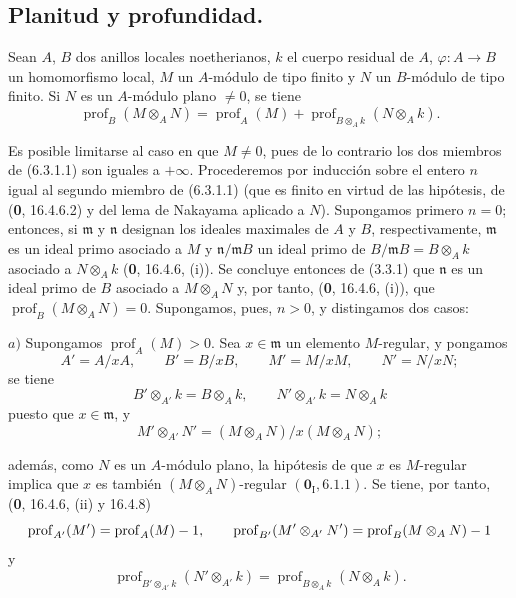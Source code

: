 \subsection{Planitud y profundidad.}

\begin{proposition}[6.3.1]
Sean $A$, $B$ dos anillos locales noetherianos, $k$ el cuerpo residual de
$A$, $\varphi:A\to B$ un homomorfismo local, $M$ un $A$-módulo de tipo finito
y $N$ un $B$-módulo de tipo finito. Si $N$ es un $A$-módulo plano $\neq0$, se
tiene
\begin{equation}
\operatorname{prof}_B(M\otimes_AN)=\operatorname{prof}_A(M)
+\operatorname{prof}_{B\otimes_Ak}(N\otimes_Ak).
\tag{6.3.1.1}\label{IV.2.s6.3.1.1-fr}
\end{equation}
\end{proposition}

Es posible limitarse al caso en que $M\neq0$, pues de lo contrario los dos
miembros de (6.3.1.1) son iguales a $+\infty$. Procederemos por inducción sobre
el entero $n$ igual al segundo miembro de (6.3.1.1) (que es finito en virtud
de las hipótesis, de (\textbf 0, 16.4.6.2) y del lema de Nakayama aplicado a $N$).
Supongamos primero $n=0$; entonces, si $\mathfrak m$ y $\mathfrak n$ designan
los ideales maximales de $A$ y $B$, respectivamente, $\mathfrak m$ es un ideal
primo asociado a $M$ y $\mathfrak n/\mathfrak mB$ un ideal primo de
$B/\mathfrak mB=B\otimes_Ak$ asociado a $N\otimes_Ak$ (\textbf 0, 16.4.6, (i)). Se
concluye entonces de (3.3.1) que $\mathfrak n$ es un ideal primo de $B$
asociado a $M\otimes_AN$ y, por tanto, (\textbf 0, 16.4.6, (i)), que
$\operatorname{prof}_B(M\otimes_AN)=0$. Supongamos, pues, $n>0$, y distingamos
dos casos:

$a)$ Supongamos $\operatorname{prof}_A(M)>0$. Sea $x\in\mathfrak m$ un
elemento $M$-regular, y pongamos
\[
A'=A/xA,\qquad B'=B/xB,\qquad M'=M/xM,\qquad N'=N/xN;
\]
se tiene
\[
B'\otimes_{A'}k=B\otimes_Ak,\qquad N'\otimes_{A'}k=N\otimes_Ak
\]
puesto que $x\in\mathfrak m$, y
\[
M'\otimes_{A'}N'=(M\otimes_AN)/x(M\otimes_AN);
\]


además, como $N$ es un $A$-módulo plano, la hipótesis de que $x$ es
$M$-regular implica que $x$ es también $(M\otimes_AN)$-regular
$(\mathbf{0}_{\mathrm I}, 6.1.1)$. Se tiene, por tanto, (\textbf 0, 16.4.6, (ii) y 16.4.8)
\[
\operatorname{prof}_{A'}(M')=\operatorname{prof}_A(M)- 1,
\qquad
\operatorname{prof}_{B'}(M'\otimes_{A'}N')
=\operatorname{prof}_B(M\otimes_AN)- 1
\]
y
\[
\operatorname{prof}_{B'\otimes_{A'}k}(N'\otimes_{A'}k)
=\operatorname{prof}_{B\otimes_Ak}(N\otimes_Ak).
\]

